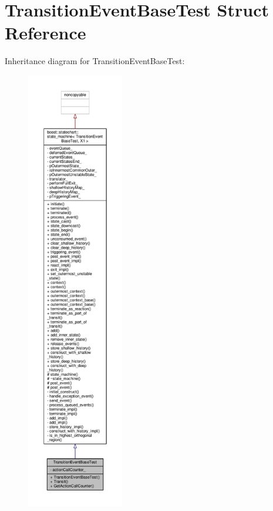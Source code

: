 \hypertarget{struct_transition_event_base_test}{}\section{Transition\+Event\+Base\+Test Struct Reference}
\label{struct_transition_event_base_test}


Inheritance diagram for Transition\+Event\+Base\+Test\+:
\nopagebreak
\begin{figure}[H]
\begin{center}
\leavevmode
\includegraphics[height=550pt]{struct_transition_event_base_test__inherit__graph}
\end{center}
\end{figure}


